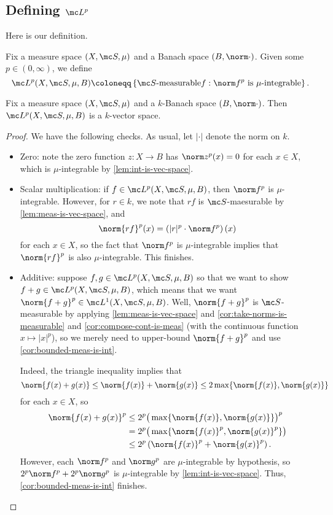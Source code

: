 \documentclass[../notes.tex]{subfiles}
\begin{document}
\subsection{Defining \texorpdfstring{$\mc L^p$}{ Lp}}
Here is our definition.
\begin{defihelper} 
	Fix a measure space $(X,\mc S,\mu)$ and a Banach space $(B,\norm\cdot)$. Given some $p\in(0,\infty)$, we define
	\[\mc L^p(X,\mc S,\mu,B)\coloneqq\left\{\mc S\text{-measurable}f:\norm f^p\text{ is }\mu\text{-integrable}\right\}.\]
\end{defihelper}
\begin{lemma} \label{lem:lp-vec-space}
	Fix a measure space $(X,\mc S,\mu)$ and a $k$-Banach space $(B,\norm\cdot)$. Then $\mc L^p(X,\mc S,\mu,B)$ is a $k$-vector space.
\end{lemma}
\begin{proof}
	We have the following checks. As usual, let $|\cdot|$ denote the norm on $k$.
	\begin{itemize}
		\item Zero: note the zero function $z\colon X\to B$ has $\norm z^p(x)=0$ for each $x\in X$, which is $\mu$-integrable by \autoref{lem:int-is-vec-space}.
		\item Scalar multiplication: if $f\in\mc L^p(X,\mc S,\mu,B)$, then $\norm f^p$ is $\mu$-integrable. However, for $r\in k$, we note that $rf$ is $\mc S$-maesurable by \autoref{lem:meas-is-vec-space}, and
		\[\norm{rf}^p(x)=\left(|r|^p\cdot\norm f^p\right)(x)\]
		for each $x\in X$, so the fact that $\norm f^p$ is $\mu$-integrable implies that $\norm{rf}^p$ is also $\mu$-integrable. This finishes.
		\item Additive: suppose $f,g\in\mc L^p(X,\mc S,\mu,B)$ so that we want to show $f+g\in\mc L^p(X,\mc S,\mu,B)$, which means that we want $\norm{f+g}^p\in\mc L^1(X,\mc S,\mu,B)$. Well, $\norm{f+g}^p$ is $\mc S$-measurable by applying \autoref{lem:meas-is-vec-space} and \autoref{cor:take-norms-is-measurable} and \autoref{cor:compose-cont-is-meas} (with the continuous function $x\mapsto|x|^p$), so we merely need to upper-bound $\norm{f+g}^p$ and use \autoref{cor:bounded-meas-is-int}.
		
		Indeed, the triangle inequality implies that
		\[\norm{f(x)+g(x)}\le\norm{f(x)}+\norm{g(x)}\le2\max\{\norm{f(x)},\norm{g(x)}\}\]
		for each $x\in X$, so
		\begin{align*}
			\norm{f(x)+g(x)}^p &\le 2^p\big(\max\{\norm{f(x)},\norm{g(x)}\}\big)^p \\
			&= 2^p\big(\max\{\norm{f(x)}^p,\norm{g(x)}^p\}\big) \\
			&\le 2^p\left(\norm{f(x)}^p+\norm{g(x)}^p\right).
		\end{align*}
		However, each $\norm f^p$ and $\norm g^p$ are $\mu$-integrable by hypothesis, so $2^p\norm f^p+2^p\norm g^p$ is $\mu$-integrable by \autoref{lem:int-is-vec-space}. Thus, \autoref{cor:bounded-meas-is-int} finishes.
		\qedhere
	\end{itemize}
\end{proof}
\end{document}
